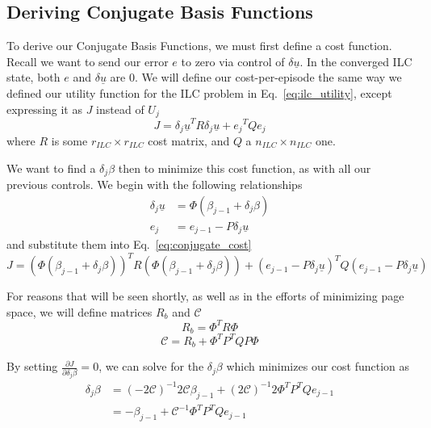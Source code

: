 \FloatBarrier\subsection{Deriving Conjugate Basis Functions}
To derive our Conjugate Basis Functions, we must first define a cost function. Recall we want to send our error $e$ to zero via control of $\delta\underline{u}$. In the converged ILC state, both $e$ and $\delta\underline{u}$ are 0. We will define our cost-per-episode the same way we defined our utility function for the ILC problem in Eq.~\ref{eq:ilc_utility}, except expressing it as $J$ instead of $U_j$
\begin{equation}
    J = {\delta_j \underline{u}}^T R {\delta_j \underline{u}} + {e_j}^T Q {e_j}
    \label{eq:conjugate_cost}
\end{equation}
where $R$ is some $r_{ILC} \times r_{ILC}$ cost matrix, and $Q$ a $n_{ILC} \times n_{ILC}$ one.

We want to find a $\delta_j \beta$ then to minimize this cost function, as with all our previous controls. We begin with the following relationships 
\begin{equation}
    \begin{split}
        \delta_j \underline{u} &= \Phi(\beta_{j-1} + \delta_j \beta) \\
        e_j &= e_{j-1} - P \delta_j \underline{u}
    \end{split}
\end{equation}
and substitute them into Eq.~\ref{eq:conjugate_cost}
\begin{equation}
    J = {\left(\Phi(\beta_{j-1} + \delta_j \beta)\right)}^T R {\left(\Phi(\beta_{j-1} + \delta_j \beta)\right)} + {\left(e_{j-1} - P \delta_j \underline{u}\right)}^T Q {\left(e_{j-1} - P \delta_j \underline{u}\right)}
    \label{eq:conjugate_cost_in_beta}
\end{equation}

For reasons that will be seen shortly, as well as in the efforts of minimizing page space, we will define matrices $R_b$ and $\mathcal{C}$
\begin{equation}
    R_b = \Phi^T R \Phi
\end{equation}
\begin{equation}
    \mathcal{C} = R_b + \Phi^T P^T Q P \Phi
    \label{eq:conjuct_setup_matrix}
\end{equation}

By setting $\frac{\partial J}{\partial \delta_j \beta} = 0$, we can solve for the $\delta_j \beta$ which minimizes our cost function as
\begin{equation}
    \begin{split}
        \delta_j \beta &= {(-2\mathcal{C})}^{-1} {2\mathcal{C}}\beta_{j-1} + {(2\mathcal{C})}^{-1}2\Phi^T P^T Qe_{j-1} \\
        &=-\beta_{j-1} + {\mathcal{C}}^{-1}\Phi^T P^T Q e_{j-1}
    \end{split}
\end{equation}

